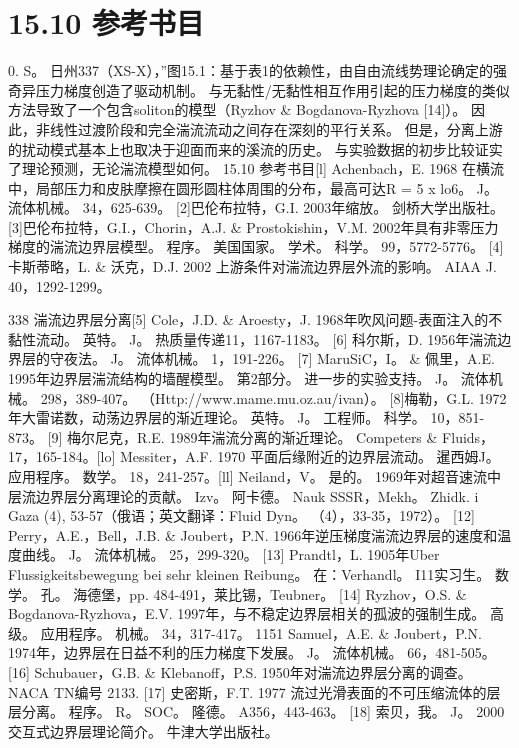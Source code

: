 \documentclass[UTF8,11pt,a4paper,openany,fontset=fandol]{ctexbook}
\begin{document}
\section{15.10 参考书目}
0. S。 日州337（XS-X），”图15.1：基于表1的依赖性，由自由流线势理论确定的强奇异压力梯度创造了驱动机制。 与无黏性/无黏性相互作用引起的压力梯度的类似方法导致了一个包含soliton的模型（Ryzhov \& Bogdanova-Ryzhova [14]）。 因此，非线性过渡阶段和完全湍流流动之间存在深刻的平行关系。 但是，分离上游的扰动模式基本上也取决于迎面而来的溪流的历史。 与实验数据的初步比较证实了理论预测，无论湍流模型如何。 15.10 参考书目[l] Achenbach，E. 1968 在横流中，局部压力和皮肤摩擦在圆形圆柱体周围的分布，最高可达R = 5 x lo6。 J。 流体机械。 34，625-639。 [2]巴伦布拉特，G.I. 2003年缩放。 剑桥大学出版社。 [3]巴伦布拉特，G.I.，Chorin，A.J. \& Prostokishin，V.M. 2002年具有非零压力梯度的湍流边界层模型。 程序。 美国国家。 学术。 科学。 99，5772-5776。 [4] 卡斯蒂略，L. \& 沃克，D.J. 2002 上游条件对湍流边界层外流的影响。 AIAA J. 40，1292-1299。

338 湍流边界层分离[5] Cole，J.D. \& Aroesty，J. 1968年吹风问题-表面注入的不黏性流动。 英特。 J。 热质量传递11，1167-1183。 [6] 科尔斯，D. 1956年湍流边界层的守夜法。 J。 流体机械。 1，191-226。 [7] MaruSiC，I。 \& 佩里，A.E. 1995年边界层湍流结构的墙醒模型。 第2部分。 进一步的实验支持。 J。 流体机械。 298，389-407。 （Http://www.mame.mu.oz.au/ivan）。 [8]梅勒，G.L. 1972年大雷诺数，动荡边界层的渐近理论。 英特。 J。 工程师。 科学。 10，851-873。 [9] 梅尔尼克，R.E. 1989年湍流分离的渐近理论。 Competers \& Fluids，17，165-184。[lo] Messiter，A.F. 1970 平面后缘附近的边界层流动。 暹西姆J。 应用程序。 数学。 18，241-257。[ll] Neiland，V。 是的。 1969年对超音速流中层流边界层分离理论的贡献。 Izv。 阿卡德。 Nauk SSSR，Mekh。 Zhidk. i Gaza (4), 53-57（俄语；英文翻译：Fluid Dyn。 （4），33-35，1972）。 [12] Perry，A.E.，Bell，J.B. \& Joubert，P.N. 1966年逆压梯度湍流边界层的速度和温度曲线。 J。 流体机械。 25，299-320。 [13] Prandtl，L. 1905年Uber Flussigkeitsbewegung bei sehr kleinen Reibung。 在：Verhandl。 I11实习生。 数学。 孔。 海德堡，pp. 484-491，莱比锡，Teubner。 [14] Ryzhov，O.S. \& Bogdanova-Ryzhova，E.V. 1997年，与不稳定边界层相关的孤波的强制生成。 高级。 应用程序。 机械。 34，317-417。 1151 Samuel，A.E. \& Joubert，P.N. 1974年，边界层在日益不利的压力梯度下发展。 J。 流体机械。 66，481-505。 [16] Schubauer，G.B. \& Klebanoff，P.S. 1950年对湍流边界层分离的调查。 NACA TN编号 2133. [17] 史密斯，F.T. 1977 流过光滑表面的不可压缩流体的层层分离。 程序。 R。 SOC。 隆德。 A356，443-463。 [18] 索贝，我。 J。 2000 交互式边界层理论简介。 牛津大学出版社。
\end{document}
